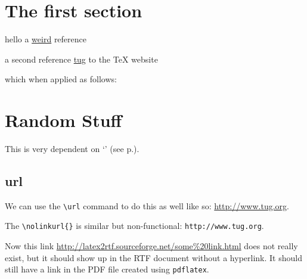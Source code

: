\documentclass{article}
\newif\iflatextortf
\begin{document}
\newcommand{\myref}[1]{`\nameref{#1}' (see p.\pageref{#1})}

\iflatextortf
\newcommand{\myurl}[1]{\nolinkurl{#1}}
\else
\let\myurl\url
\fi

\section{The first section}
hello a 
\href{http://www-fourier.ujf-grenoble.fr:80/cgi-bin/zbfr/ZB/math-fr.html?AU=Taylor,+R&format=complete&type=html&maxdocs=10}{weird}
reference

a second reference 
\href{http://www.tug.org/}{tug}
to the \TeX{} website 

which when applied as follows:

\section{Random Stuff}\label{randomlabel}
This is very dependent on \myref{randomlabel}.


\subsection{url}
We can use the \verb#\url# command to do this as
well like so: \url{http://www.tug.org}.  

The \verb#\nolinkurl{}# is similar but non-functional: \nolinkurl{http://www.tug.org}. 

Now this link \url{http://latex2rtf.sourceforge.net/some%20link.html} does not really
exist, but it should show up in the RTF document without a hyperlink.  It should still
have a link in the PDF file created using \texttt{pdflatex}.
\end{document}

